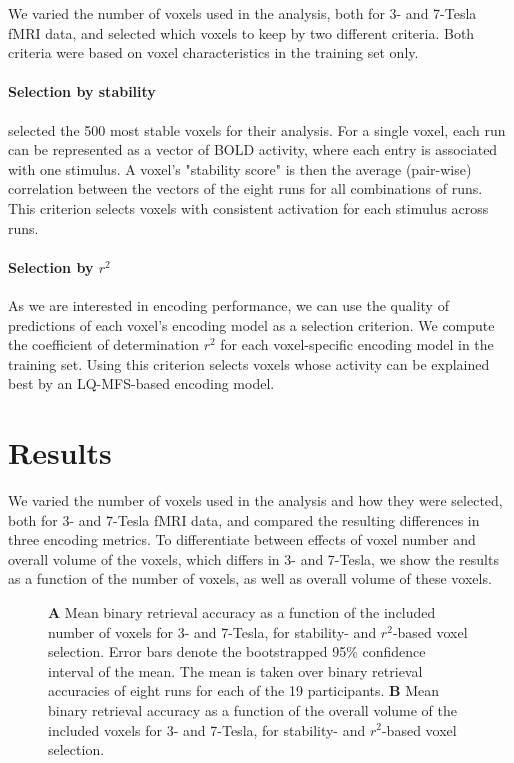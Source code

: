 We varied the number of voxels used in the analysis, both for 3- and 7-Tesla f{MRI} data,
and selected which voxels to keep by two different criteria. Both criteria were
based on voxel characteristics in the training set only.

\paragraph{Selection by stability}

\citet{ML08} selected the 500 most stable voxels for their analysis. For a
single voxel, each run can be represented as a vector of BOLD activity, where each
entry is associated with one stimulus. A voxel's "stability score" is then the
average (pair-wise) correlation between the vectors of the eight runs for all
combinations of runs.
This criterion selects voxels with consistent activation for each stimulus across runs.

\paragraph{Selection by $r^2$}

As we are interested in encoding performance, we can use the quality of
predictions of each voxel's encoding model as a selection criterion. We compute
the coefficient of determination $r^2$ for each voxel-specific encoding model in
the training set. Using this criterion selects voxels whose activity can be explained best
by an LQ-MFS-based encoding model.

\section*{Results}

We varied the number of voxels used in the analysis and how they were selected,
both for 3- and 7-Tesla f{MRI} data, and compared the resulting differences in
three encoding metrics. To differentiate between effects of voxel number and
overall volume of the voxels, which differs in 3- and 7-Tesla, we show the results as a function of the number of voxels, as well as overall volume of
these voxels.

\begin{figure}
  \centering
  \def\svgwidth{\linewidth}
  
	
  \caption{\textbf{A} Mean binary retrieval accuracy as a function of the included number of
  voxels for 3- and 7-Tesla, for stability- and $r^2$-based voxel selection. Error bars denote the bootstrapped 95\% confidence
  interval of the mean. The mean is taken over binary retrieval accuracies of
  eight runs for each of the 19 participants. \textbf{B} Mean binary retrieval accuracy as a function of the overall volume of
	  the included voxels for 3- and 7-Tesla, for stability- and $r^2$-based voxel selection.}

 \label{fig:binary_retrieval}
\end{figure}

